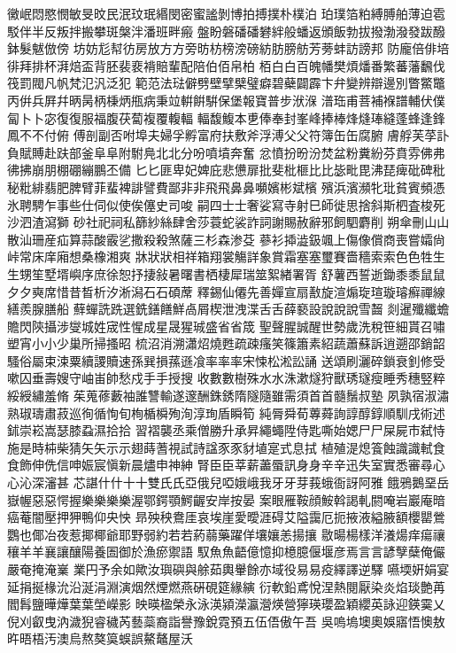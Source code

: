 黴岷悶愍憫敏旻旼民泯玟珉緡閔密蜜謐剝博拍搏撲朴樸泊
珀璞箔粕縛膊舶薄迫雹駁伴半反叛拌搬攀斑槃泮潘班畔瘢
盤盼磐磻磻礬絆般蟠返頒飯勃拔撥渤潑發跋醱鉢髮魃倣傍
坊妨尨幇彷房放⽅方旁昉枋榜滂磅紡肪膀舫芳蒡蚌訪謗邦
防龐倍俳培徘拜排杯湃焙盃背胚裴裵褙賠輩配陪伯佰帛柏
栢⽩白百魄幡樊煩燔番繁蕃藩飜伐筏罰閥凡帆梵氾汎泛犯
範范法琺僻劈壁擘檗璧癖碧蘗闢霹卞弁變辨辯邊別瞥鱉鼈
丙倂兵屛幷昞昺柄棅炳甁病秉竝輧餠騈保堡報寶普步洑湺
潽珤甫菩補褓譜輔伏僕匐⼘卜宓復復服福腹茯蔔複覆輹輻
輻馥鰒本乶俸奉封峯峰捧棒烽熢琫縫蓬蜂逢鋒鳳不不付俯
傅剖副否咐埠夫婦孚孵富府扶敷斧浮溥⽗父符簿⽸缶腐腑
膚艀芙莩訃負賦賻赴趺部釜⾩阜附駙鳧北北分吩噴墳奔奮
忿憤扮昐汾焚盆粉糞紛芬賁雰佛弗彿拂崩朋棚硼繃鵬丕備
⼔匕匪卑妃婢庇悲憊扉批斐枇榧⽐比毖毗毘沸琵痺砒碑秕
秘粃緋翡肥脾臂菲蜚裨誹譬費鄙⾮非⾶飛⿐鼻嚬嬪彬斌檳
殯浜濱瀕牝玭貧賓頻憑氷聘騁乍事些仕伺似使俟僿史司唆
嗣四⼠士奢娑寫寺射巳師徙思捨斜斯柶査梭死沙泗渣瀉獅
砂社祀祠私篩紗絲肆舍莎蓑蛇裟詐詞謝賜赦辭邪飼駟麝削
朔傘刪⼭山散汕珊産疝算蒜酸霰乷撒殺殺煞薩三杉森渗芟
蔘衫揷澁鈒颯上傷像償商喪嘗孀尙峠常床庠廂想桑橡湘爽
牀狀狀相祥箱翔裳觴詳象賞霜塞塞璽賽嗇穡索索⾊色牲⽣
生甥笙墅壻嶼序庶徐恕抒捿敍暑曙書栖棲犀瑞筮絮緖署胥
舒薯西誓逝鋤⿉黍⿏鼠⼣夕奭席惜昔晳析汐淅潟⽯石碩蓆
釋錫仙僊先善嬋宣扇敾旋渲煽琁瑄璇璿癬禪線繕羨腺膳船
蘚蟬詵跣選銑鐥饍鮮卨屑楔泄洩渫⾆舌薛褻設說說說雪齧
剡暹殲纖蟾贍閃陝攝涉燮城姓宬性惺成星晟猩珹盛省省筬
聖聲腥誠醒世勢歲洗稅笹細貰召嘯塑宵⼩小少巢所掃搔昭
梳沼消溯瀟炤燒甦疏疎瘙笑篠簫素紹蔬蕭蘇訴逍遡邵銷韶
騷俗屬束涑粟續謖贖速孫巽損蓀遜飡率率率宋悚松淞訟誦
送頌刷灑碎鎖衰釗修受嗽囚垂壽嫂守岫峀帥愁戍⼿手授搜
收數數樹殊⽔水洙漱燧狩獸琇璲瘦睡秀穗竪粹綏綬繡羞脩
茱蒐蓚藪袖誰讐輸遂邃酬銖銹隋隧隨雖需須⾸首髓鬚叔塾
夙孰宿淑潚熟琡璹肅菽巡徇循恂旬栒楯橓殉洵淳珣盾瞬筍
純脣舜荀蓴蕣詢諄醇錞順馴戌術述鉥崇崧嵩瑟膝蝨濕拾拾
習褶襲丞乘僧勝升承昇繩蠅陞侍匙嘶始媤⼫尸屎屍市弑恃
施是時枾柴猜⽮矢⽰示翅蒔蓍視試詩諡⾗豕豺埴寔式息拭
植殖湜熄篒蝕識識軾⾷食飾伸侁信呻娠宸愼新晨燼申神紳
腎⾂臣莘薪藎蜃訊⾝身⾟辛迅失室實悉審尋⼼心沁深瀋甚
芯諶什什⼗十雙⽒氏亞俄兒啞娥峨我⽛牙芽莪蛾衙訝阿雅
餓鴉鵝堊岳嶽幄惡惡愕握樂樂樂樂渥鄂鍔顎鰐齷安岸按晏
案眼雁鞍顔鮟斡謁軋閼唵岩巖庵暗癌菴闇壓押狎鴨仰央怏
昻殃秧鴦厓哀埃崖愛曖涯碍艾隘靄厄扼掖液縊腋額櫻罌鶯
鸚也倻冶夜惹揶椰爺耶野弱約若若葯蒻藥躍佯壤孃恙揚攘
敭暘楊樣洋瀁煬痒瘍禳穰⽺羊襄讓釀陽養圄御於漁瘀禦語
馭⿂魚齬億憶抑檍臆偃堰彦焉⾔言諺孼蘖俺儼嚴奄掩淹嶪
業円予余如歟汝璵礖與艅茹輿轝餘亦域役易易疫繹譯逆驛
嚥堧姸娟宴延捐挻椽沇沿涎涓淵演烟然煙燃燕硏硯筵緣縯
衍軟鉛鳶悅涅熱閱厭染炎焰琰艶苒閻髥鹽曄燁葉葉塋嶸影
映暎楹榮永泳渶潁濚瀛瀯煐營獰瑛瓔盈穎纓英詠迎鍈霙乂
倪刈叡曳汭濊猊睿穢芮藝蘂裔詣譽豫銳霓預五伍俉傲午吾
吳嗚塢墺奧娛寤悟懊敖旿晤梧汚澳烏熬獒筽蜈誤鰲鼇屋沃
